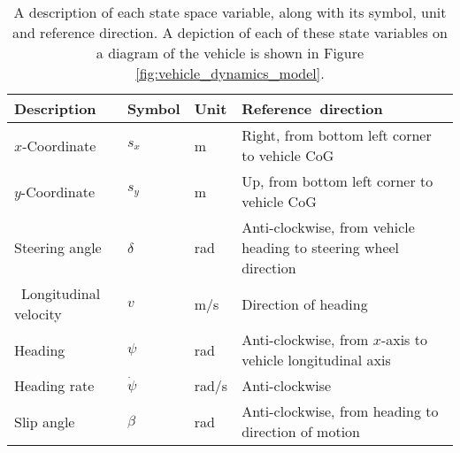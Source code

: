 
\begin{table}[!htb]
\renewcommand{\arraystretch}{1.1}
\centering
\begin{tabularx}{\textwidth}{RLLX} 
    \hline
    \small \textbf{Description} & \small \textbf{Symbol} & \small \textbf{Unit} & \small \textbf{\mbox{Reference direction}} \\ 
    \hline
    \small $x$-Coordinate              & \small $s_x$             & \small m       & \small Right, from bottom left corner to vehicle CoG\\
    \small $y$-Coordinate              & \small $s_y$             & \small m       & \small Up, from bottom left corner to vehicle CoG\\
    \small Steering angle              & \small $\delta$          & \small rad     & \small Anti-clockwise, from vehicle heading to steering wheel                                                                                          direction\\\
    \small Longitudinal velocity       & \small $v$               & \small m/s     & \small Direction of heading \\
    \small Heading                     & \small $\psi$            & \small rad     & \small Anti-clockwise, from $x$-axis to vehicle longitudinal axis\\
    \small Heading rate                & \small $\dot{\psi}$      & \small rad/s   & \small Anti-clockwise \\
    \small Slip angle                  & \small $\beta$           & \small rad     & \small Anti-clockwise, from heading to direction of motion \\
    \hline
\end{tabularx}
\caption[A description of the state space variables]{A description of each state space variable, along with its symbol, unit and reference direction. A depiction of each of these state variables on a diagram of the vehicle is shown in Figure \ref{fig:vehicle_dynamics_model}.}
\label{tab:state_space_variables}
\end{table}
